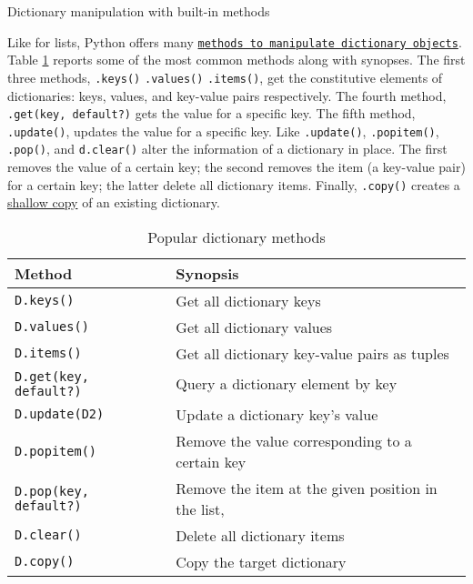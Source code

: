 \documentclass[a4paper,11pt]{book}
\numberwithin{figure}{chapter}
\numberwithin{table}{chapter}
\newcommand{\question}[1]{%
    \begin{tcolorbox}[colback=comp_c!10,colframe=comp_c,sidebyside align=top,width=\linewidth,before skip=1ex]
        #1
    \end{tcolorbox}
    \switchcolumn%
}
\newcommand{\note}[1]{%
    \begin{tcolorbox}[colback=white!0,colframe=white!10,width=\linewidth,before skip=1ex]
        #1
    \end{tcolorbox}
}
\begin{document}
\begin{paracol}{2}
\question{\raggedright Dictionary manipulation with built-in methods}
\note{Like for lists, Python offers many \href{https://docs.python.org/3/tutorial/datastructures.html\#dictionaries}{\texttt{methods to manipulate dictionary objects}}. Table \ref{tab:dictionary_methods} reports some of the most common methods along with synopses. The first three methods, \texttt{.keys()} \texttt{.values()} \texttt{.items()}, get the constitutive elements of dictionaries: keys, values, and key-value pairs respectively. The fourth method, \texttt{.get(key, default?)} gets the value for a specific key. The fifth method, \texttt{.update()}, updates the value for a specific key. Like \texttt{.update()}, \texttt{.popitem()}, \texttt{.pop()}, and \texttt{d.clear()} alter the information of a dictionary in place. The first removes the value of a certain key; the second removes the item (a key-value pair) for a certain key; the latter delete all dictionary items. Finally, \texttt{.copy()} creates a \href{https://docs.python.org/3/library/copy.html}{shallow copy} of an existing dictionary.}
\end{paracol}

\begin{table}[!htbp]
	\caption{Popular dictionary methods}
	\label{tab:dictionary_methods}
	\centering
	\begin{tabular}{ll}
		\toprule \toprule
		Method & Synopsis \\
		\midrule 
		\texttt{D.keys()} & Get all dictionary keys\\
		\texttt{D.values()} & Get all dictionary values \\ 
		\texttt{D.items() } & Get all dictionary key-value pairs as tuples \\
		\texttt{D.get(key, default?)} & Query a dictionary element by key\\ 
		\texttt{D.update(D2) } & Update a dictionary key's value\\
		\texttt{D.popitem()} & Remove the value corresponding to a certain key \\ 
		\texttt{D.pop(key, default?) } & Remove the item at the given position in the list,\\
		\texttt{D.clear() } & Delete all dictionary items\\
		\texttt{D.copy() } & Copy the target dictionary \\
		\bottomrule 
	\end{tabular}
\end{table}
\end{document}
